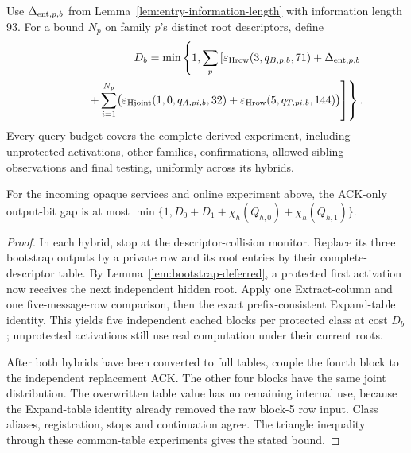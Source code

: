 Use $\Delta_{{\rm ent},p,b}$ from
Lemma~\ref{lem:entry-information-length} with information length 93.
For a bound $N_p$ on family $p$'s distinct root descriptors, define
\begin{equation}
 \begin{split}
 D_b=\min\left\{1,\sum_p\left[
   \varepsilon_{\rm Hrow}(3,q_{B,p,b},71)
     +\Delta_{{\rm ent},p,b}\right.\right.\\
 \left.\left.\hspace{12mm}
  +\sum_{i=1}^{N_p}\bigl(
      \varepsilon_{\rm Hjoint}(1,0,q_{A,pi,b},32)
      +\varepsilon_{\rm Hrow}(5,q_{T,pi,b},144)\bigr)
       \right]\right\}.
 \end{split}
 \label{eq:bootstrap-tail}
\end{equation}
Every query budget covers the complete derived experiment, including
unprotected activations, other families, confirmations, allowed sibling
observations and final testing, uniformly across its hybrids.

\begin{proposition}
\label{prop:bootstrap-ack-table}
For the incoming opaque services and online experiment above, the
ACK-only output-bit gap is at most
$\min\{1,D_0+D_1+\chi_h(Q_{h,0})+\chi_h(Q_{h,1})\}$.
\end{proposition}
\begin{proof}
In each hybrid, stop at the descriptor-collision monitor. Replace its
three bootstrap outputs by a private row and its root entries by their
complete-descriptor table. By Lemma~\ref{lem:bootstrap-deferred}, a
protected first activation now receives the next independent hidden
root. Apply one Extract-column and one five-message-row comparison,
then the exact prefix-consistent Expand-table identity. This yields
five independent cached blocks per protected class at cost $D_b$;
unprotected activations still use real computation under their current roots.

After both hybrids have been converted to full tables, couple the fourth
block to the independent replacement ACK. The other four blocks have the
same joint distribution.
The overwritten table value has no remaining internal use, because the
Expand-table identity already removed the raw block-5 row input.
Class aliases, registration, stops and continuation agree. The triangle
inequality through these common-table experiments gives the stated bound.
\end{proof}

